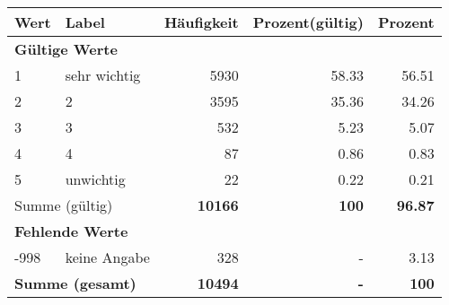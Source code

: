      \begin{longtable}{lXrrr}
     \toprule
     \textbf{Wert} & \textbf{Label} & \textbf{Häufigkeit} & \textbf{Prozent(gültig)} & \textbf{Prozent} \\
     \endhead
     \midrule
     \multicolumn{5}{l}{\textbf{Gültige Werte}}\\

     1 &
     \multicolumn{1}{X}{ sehr wichtig   } &


       \num{5930} &
       \num[round-mode=places,round-precision=2]{58.33} &
         \num[round-mode=places,round-precision=2]{56.51} \\

     2 &
     \multicolumn{1}{X}{ 2   } &


       \num{3595} &
       \num[round-mode=places,round-precision=2]{35.36} &
         \num[round-mode=places,round-precision=2]{34.26} \\

     3 &
     \multicolumn{1}{X}{ 3   } &


       \num{532} &
       \num[round-mode=places,round-precision=2]{5.23} &
         \num[round-mode=places,round-precision=2]{5.07} \\

     4 &
     \multicolumn{1}{X}{ 4   } &


       \num{87} &
       \num[round-mode=places,round-precision=2]{0.86} &
         \num[round-mode=places,round-precision=2]{0.83} \\

     5 &
     \multicolumn{1}{X}{ unwichtig   } &


       \num{22} &
       \num[round-mode=places,round-precision=2]{0.22} &
         \num[round-mode=places,round-precision=2]{0.21} \\
     \midrule
     \multicolumn{2}{l}{Summe (gültig)} &
       \textbf{\num{10166}} &
     \textbf{\num{100}} &
       \textbf{\num[round-mode=places,round-precision=2]{96.87}} \\
     \multicolumn{5}{l}{\textbf{Fehlende Werte}}\\
       -998 &
       keine Angabe &
         \num{328} &
        - &
         \num[round-mode=places,round-precision=2]{3.13} \\
     \midrule
     \multicolumn{2}{l}{\textbf{Summe (gesamt)}} &
          \textbf{\num{10494}} &
        \textbf{-} &
        \textbf{\num{100}} \\
     \bottomrule
     \end{longtable}
     

